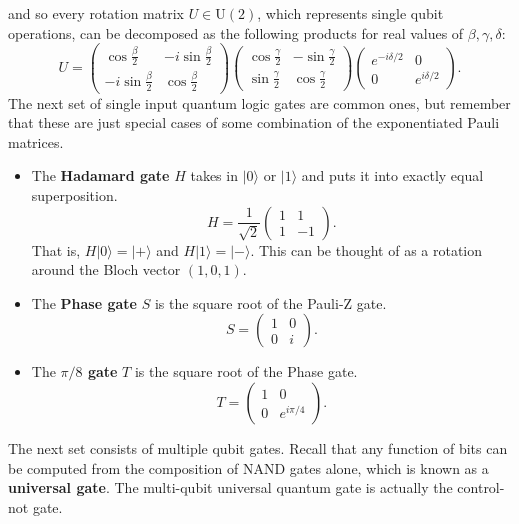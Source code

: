 \documentclass{article}
\theoremstyle{definition}
\begin{document}
and so every rotation matrix $U \in \text{U}(2)$, which represents single qubit operations, can be decomposed as the following products for real values of $\beta, \gamma, \delta$:
\[U = \begin{pmatrix} \cos \frac{\beta}{2} & -i \sin \frac{\beta}{2} \\ -i \sin \frac{\beta}{2} & \cos \frac{\beta}{2} \end{pmatrix} \begin{pmatrix} \cos \frac{\gamma}{2} & - \sin \frac{\gamma}{2} \\ \sin \frac{\gamma}{2} & \cos \frac{\gamma}{2} \end{pmatrix} \begin{pmatrix} e^{-i \delta /2} & 0 \\ 0 & e^{i\delta/2} \end{pmatrix}.\]
The next set of single input quantum logic gates are common ones, but remember that these are just special cases of some combination of the exponentiated Pauli matrices.
\begin{itemize}
  \item The \textbf{Hadamard gate} $H$ takes in $|0\rangle$ or $|1\rangle$ and puts it into exactly equal superposition.
    \[H = \frac{1}{\sqrt{2}} \begin{pmatrix} 1 & 1 \\ 1 & -1 \end{pmatrix}.\]
    That is, $H|0\rangle = |+\rangle$ and $H|1\rangle = |-\rangle$. This can be thought of as a rotation around the Bloch vector $(1, 0, 1)$.
  \item The \textbf{Phase gate} $S$ is the square root of the Pauli-Z gate.
    \[S = \begin{pmatrix} 1 & 0 \\ 0 & i \end{pmatrix}.\]
  \item The \textbf{$\pi/8$ gate} $T$ is the square root of the Phase gate.
    \[T = \begin{pmatrix} 1 & 0 \\ 0 & e^{i \pi/4} \end{pmatrix}.\]
\end{itemize}
The next set consists of multiple qubit gates. Recall that any function of bits can be computed from the composition of NAND gates alone, which is known as a \textbf{universal gate}. The multi-qubit universal quantum gate is actually the control-not gate.
\end{document}
